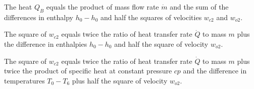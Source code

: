 The heat \( Q_B \) equals the product of mass flow rate \( \dot{m} \) and the sum of the differences in enthalpy \( h_0 - h_0 \) and half the squares of velocities \( w_{c2} \) and \( w_{o2} \).

The square of \( w_{c2} \) equals twice the ratio of heat transfer rate \( \dot{Q} \) to mass \( m \) plus the difference in enthalpies \( h_0 - h_0 \) and half the square of velocity \( w_{o2} \).

The square of \( w_{c2} \) equals twice the ratio of heat transfer rate \( \dot{Q} \) to mass \( m \) plus twice the product of specific heat at constant pressure \( cp \) and the difference in temperatures \( T_0 - T_6 \) plus half the square of velocity \( w_{o2} \).